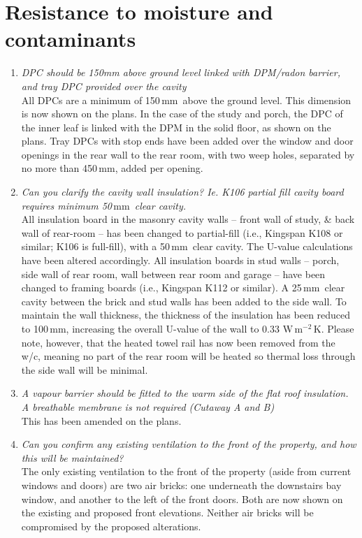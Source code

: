 \documentclass{extension}
\newcommand{\mm}{\,$\mathrm{mm}$}
\newcommand{\uunit}{\,$\mathrm{W\,m^{-2}\,K}$}
\begin{document}
\section{Resistance to moisture and contaminants}
\begin{enumerate}
\item {\it DPC should be 150mm above ground level linked with DPM/radon barrier, and tray DPC provided over the cavity}\\
All DPCs are a minimum of 150\mm\ above the ground level. This dimension is now shown on the plans. In the case of the study and porch, the DPC of the inner leaf is linked with the DPM in the solid floor, as shown on the plans. Tray DPCs with stop ends have been added over the window and door openings in the rear wall to the rear room, with two weep holes, separated by no more than 450\mm , added per opening.
\item {\it Can you clarify the cavity wall insulation? Ie. K106 partial fill cavity board requires minimum 50\mm\ clear cavity.}\\
All insulation board in the masonry cavity walls -- front wall of study, \& back wall of rear-room -- has been changed to partial-fill (i.e., Kingspan K108 or similar; K106 is full-fill), with a 50\mm\ clear cavity. The U-value calculations have been altered accordingly. All insulation boards in stud walls -- porch, side wall of rear room, wall between rear room and garage -- have been changed to framing boards (i.e., Kingspan K112 or similar). A 25\mm\ clear cavity between the brick and stud walls has been added to the side wall. To maintain the wall thickness, the thickness of the insulation has been reduced to 100\mm , increasing the overall U-value of the wall to 0.33\,\uunit . Please note, however, that the heated towel rail has now been removed from the w/c, meaning no part of the rear room will be heated so thermal loss through the side wall will be minimal.
\item {\it A vapour barrier should be fitted to the warm side of the flat roof insulation. A breathable membrane is not required (Cutaway A and B)}\\
This has been amended on the plans.
\item {\it Can you confirm any existing ventilation to the front of the property, and how this will be maintained?}\\
The only existing ventilation to the front of the property (aside from current windows and doors) are two air bricks: one underneath the downstairs bay window, and another to the left of the front doors. Both are now shown on the existing and proposed front elevations. Neither air bricks will be compromised by the proposed alterations.
\end{enumerate}
\end{document}
